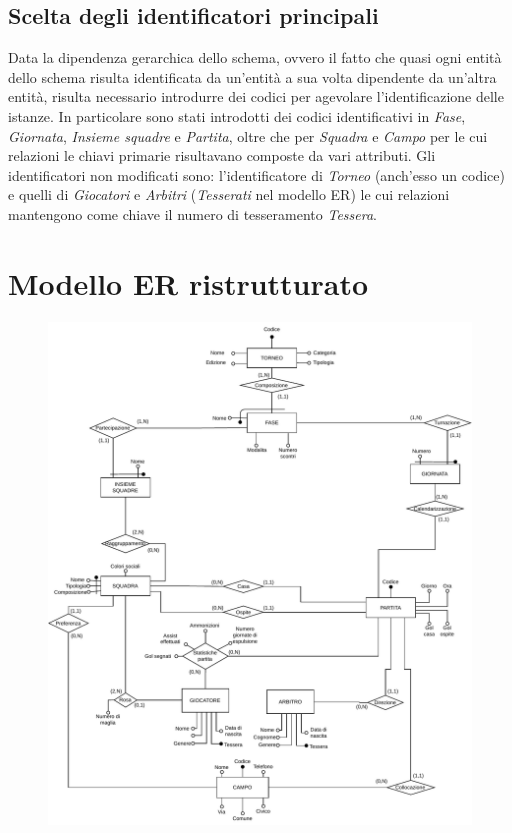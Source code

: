 \documentclass[11pt, openany]{article}
\theoremstyle{definition}
\theoremstyle{plain}
\theoremstyle{remark}
\begin{document}
			\subsection{Scelta degli identificatori principali}
				Data la dipendenza gerarchica dello schema, ovvero il fatto che quasi ogni entità dello schema risulta identificata da un’entità a sua volta dipendente da un’altra entità, risulta necessario introdurre dei codici per agevolare l’identificazione delle istanze. In particolare sono stati introdotti dei codici identificativi in \textit{Fase}, \textit{Giornata}, \textit{Insieme squadre} e \textit{Partita}, oltre che per \textit{Squadra} e \textit{Campo} per le cui relazioni le chiavi primarie risultavano composte da vari attributi. Gli identificatori non modificati sono: l'identificatore di \textit{Torneo} (anch’esso un codice) e quelli di \textit{Giocatori} e \textit{Arbitri} (\textit{Tesserati} nel modello ER) le cui relazioni mantengono come chiave il numero di tesseramento \textit{Tessera}.
				
		\section{Modello ER ristrutturato}
			\begin{figure}[h!]
				\includegraphics[scale=0.8, center]{./include/bdsi-prog-2023-Logic.pdf}
				\label{fig:ER ristrutturato}
			\end{figure}
		
\end{document}
